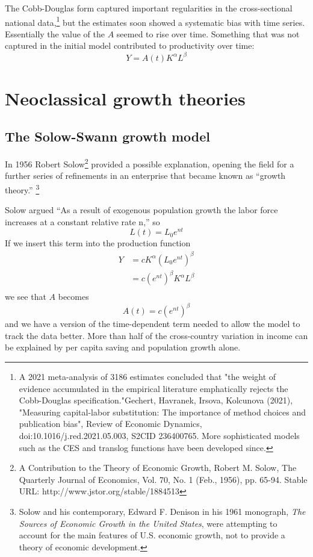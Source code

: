 The Cobb-Douglas form captured  important regularities in the cross-sectional national data,\footnote{ A 2021 meta-analysis of 3186 estimates concluded that "the weight of evidence accumulated in the empirical literature emphatically rejects the Cobb-Douglas specification."Gechert, Havranek, Irsova, Kolcunova (2021), "Measuring capital-labor substitution: The importance of method choices and publication bias", Review of Economic Dynamics, doi:10.1016/j.red.2021.05.003, S2CID 236400765. More sophisticated models  such as the CES and translog functions have been developed  since.} 
but the estimates soon showed a systematic bias with time series. Essentially the value of the $A$ seemed to rise over time. Something that was not captured in the initial model  contributed to productivity over time: 
 \[Y=A(t)K^\alpha L^\beta\]

  \section{Neoclassical growth theories}  

 \subsection{The Solow-Swann growth model}
In 1956 Robert Solow\footnote{A Contribution to the Theory of Economic Growth,  Robert M. Solow, The Quarterly Journal of Economics, Vol. 70, No. 1 (Feb., 1956), pp. 65-94. Stable URL: http://www.jstor.org/stable/1884513} provided a possible explanation, opening the field for a further series of refinements in an enterprise that became known as ``growth theory.''
\footnote{Solow and his contemporary, Edward F. Denison in his 1961 monograph, \textit{The Sources of Economic Growth in the United States}, were attempting to account for the main features of U.S. economic growth, not to provide a theory of economic development.}%

Solow argued ``As a result of exogenous population growth the labor force increases at a constant relative rate n,'' so
  \[L(t)= L_0e^{nt}\] 
If we insert this term into the production function 
 \begin{eqnarray}
 Y&=cK^\alpha (L_0e^{nt})^\beta\\
    &=c(e^{nt})^{\beta}K^\alpha L^\beta\\
 \end{eqnarray}
we see that $A$ becomes
 \[A(t)=c(e^{nt})^\beta\]
and we have a version of the time-dependent term needed to  allow the model to track the data better. More than half  of the cross-country variation in income can be explained by per capita saving and population growth alone.




